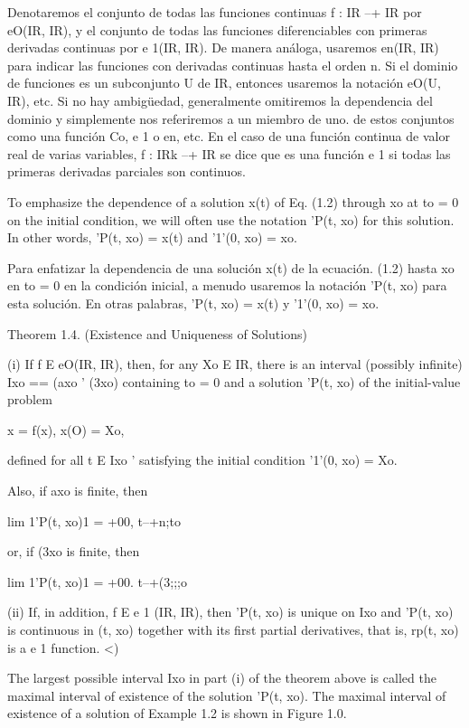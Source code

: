 \documentclass[]{article}
\begin{document}
Denotaremos el conjunto de todas las funciones continuas f : IR --+ IR por eO(IR, IR), y el conjunto de todas las funciones diferenciables con primeras derivadas continuas por e 1(IR, IR). De manera análoga, usaremos en(IR, IR) para indicar las funciones con derivadas continuas hasta el orden n. Si el dominio de funciones es un subconjunto U de IR, entonces usaremos la notación eO(U, IR), etc. Si no hay ambigüedad, generalmente omitiremos la dependencia del dominio y simplemente nos referiremos a un miembro de uno. de estos conjuntos como una función Co, e 1 o en, etc. En el caso de una función continua de valor real de varias variables, f : IRk --+ IR se dice que es una función e 1 si todas las primeras derivadas parciales son continuos.

To emphasize the dependence of a solution x(t) of Eq. (1.2) through xo at to = 0 on the initial condition, we will often use the notation 'P(t, xo) for this solution. In other words, 'P(t, xo) = x(t) and '1'(0, xo) = xo.

Para enfatizar la dependencia de una solución x(t) de la ecuación. (1.2) hasta xo en to = 0 en la condición inicial, a menudo usaremos la notación 'P(t, xo) para esta solución. En otras palabras, 'P(t, xo) = x(t) y '1'(0, xo) = xo.

Theorem 1.4. (Existence and Uniqueness of Solutions)

(i) If f E eO(IR, IR), then, for any Xo E IR, there is an interval (possibly infinite) Ixo == (axo ' (3xo) containing to = 0 and a solution 'P(t, xo) of the initial-value problem

x = f(x), x(O) = Xo,

defined for all t E Ixo ' satisfying the initial condition '1'(0, xo) = Xo.

Also, if axo is finite, then

lim 1'P(t, xo)1 = +00,
t--+n;to

or, if (3xo is finite, then

lim 1'P(t, xo)1 = +00.
t--+(3;;;o

(ii) If, in addition, f E e 1 (IR, IR), then 'P(t, xo) is unique on Ixo and 'P(t, xo) is continuous in (t, xo) together with its first partial derivatives, that is, rp(t, xo) is a e 1 function. <)

The largest possible interval Ixo in part (i) of the theorem above is called the maximal interval of existence of the solution 'P(t, xo). The maximal interval of existence of a solution of Example 1.2 is shown in Figure 1.0.
\end{document}
